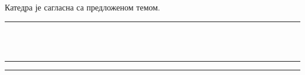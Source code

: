 \documentclass[a4paper]{article}
\begin{document}
\begin{flushleft}
Катедра  је сагласна са предложеном темом.
\vspace{-3mm}
\hspace*{13mm} \rule[2.3cm]{9.5cm}{.05mm}\\
\vspace{-1cm}
\makebox[6.5cm][c]{} \hfill \makebox[6.5cm][c]{}\\
\rule[4mm]{6.5cm}{.05mm} \hfill \rule[4mm]{6.5cm}{.05mm}\\
\vspace{-5mm}
 \hfill {}
\end{flushleft}
\end{document}
